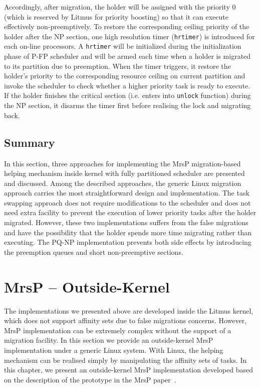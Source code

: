 \documentclass{report}
\begin{document}
Accordingly, after migration, the holder will be assigned with the priority 0 (which is reserved by Litmus for priority boosting) so that it can execute effectively non-preemptively. To restore the corresponding ceiling priority of the holder after the NP section, one high resolution timer (\texttt{hrtimer}) is introduced for each on-line processors. A \texttt{hrtimer} will be initialized during the initialization phase of P-FP scheduler and will be armed each time when a holder is migrated to its partition due to preemption. When the timer triggers, it restore the holder's priority to the corresponding resource ceiling on current partition and invoke the scheduler to check whether a higher priority task is ready to execute. If the holder finishes the critical section (i.e. enters into \texttt{unlock} function) during the NP section, it disarms the timer first before realising the lock and migrating back. 

\section{Summary}
In this section, three approaches for implementing the MrsP migration-based helping mechanism inside kernel with fully partitioned scheduler are presented and discussed. Among the described approaches, the generic Linux migration approach carries the most straightforward design and implementation. The task swapping approach does not require modifications to the scheduler and does not need extra facility to prevent the execution of lower priority tasks after the holder migrated. However, these two implementations suffers from the false migrations and have the possibility that the holder spends more time migrating rather than executing. The PQ-NP implementation prevents both side effects by introducing the preemption queues and short non-preemptive sections.

\chapter{MrsP -- Outside-Kernel}
\label{Out Kernel}
The implementations we presented above are developed inside the Litmus kernel, which does not support affinity sets due to false migrations concerns. However, MrsP implementation can be extremely complex without the support of a migration facility. In this section we provide an outside-kernel MrsP implementation under a generic Linux system. With Linux, the helping mechanism can be realised simply by manipulating the affinity sets of tasks. In this chapter, we present an outside-kernel MrsP implementation developed based on the description of the prototype in the MrsP paper~\cite{burns2013schedulability}. 
\end{document}

